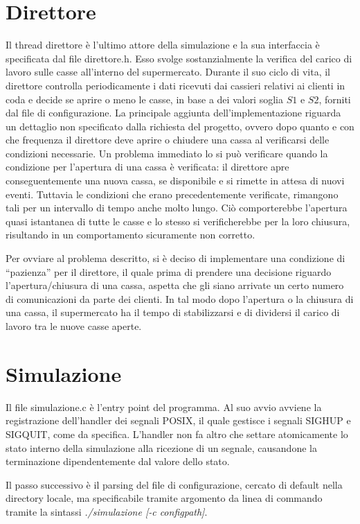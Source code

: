 \documentclass[11pt]{article}
\begin{document}
\section{Direttore}
Il thread direttore è l'ultimo attore della simulazione e la sua interfaccia è
specificata dal file direttore.h. Esso svolge sostanzialmente la verifica del
carico di lavoro sulle casse all'interno del supermercato. Durante il suo ciclo
di vita, il direttore controlla periodicamente i dati ricevuti dai cassieri
relativi ai clienti in coda e decide se aprire o meno le casse, in base a dei
valori soglia $S1$ e $S2$, forniti dal file di configurazione. La principale
aggiunta dell'implementazione riguarda un dettaglio non specificato dalla
richiesta del progetto, ovvero dopo quanto e con che frequenza il direttore
deve aprire o chiudere una cassa al verificarsi delle condizioni necessarie. Un
problema immediato lo si può verificare quando la condizione per l'apertura di
una cassa è verificata: il direttore apre conseguentemente una nuova cassa, se
disponibile e si rimette in attesa di nuovi eventi. Tuttavia le condizioni che
erano precedentemente verificate, rimangono tali per un intervallo di tempo
anche molto lungo. Ciò comporterebbe l'apertura quasi istantanea di tutte le
casse e lo stesso si verificherebbe per la loro chiusura, risultando in un
comportamento sicuramente non corretto.

Per ovviare al problema descritto, si è deciso di implementare una condizione
di ``pazienza'' per il direttore, il quale prima di prendere una decisione
riguardo l'apertura/chiusura di una cassa, aspetta che gli siano arrivate
un certo numero di comunicazioni da parte dei clienti. In tal modo dopo
l'apertura o la chiusura di una cassa, il supermercato ha il tempo di
stabilizzarsi e di dividersi il carico di lavoro tra le nuove casse aperte.

\section{Simulazione}
Il file simulazione.c è l'entry point del programma. Al suo avvio avviene la
registrazione dell'handler dei segnali POSIX, il quale gestisce i segnali
SIGHUP e SIGQUIT, come da specifica. L'handler non fa altro che settare
atomicamente lo stato interno della simulazione alla ricezione di un segnale,
causandone la terminazione dipendentemente dal valore dello stato.

Il passo successivo è il parsing del file di configurazione, cercato di default
nella directory locale, ma specificabile tramite argomento da linea di commando
tramite la sintassi \emph{./simulazione [-c configpath]}.
\end{document}
